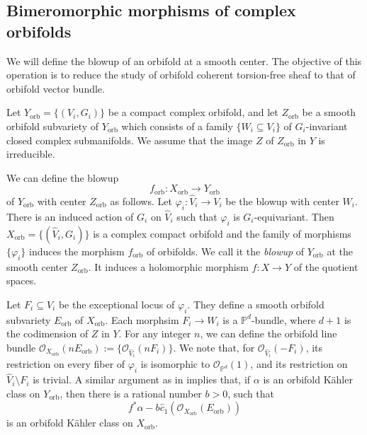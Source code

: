 \documentclass[12pt]{amsart}
\newcommand{\<}{\leq}
\def\mcO{\mathcal{O}}
\theoremstyle{remark}
\theoremstyle{definition}
\theoremstyle{definition}
\numberwithin{equation}{section}
\theoremstyle{definition}
\theoremstyle{definition}
\def\orb{\mathrm{orb}}
\begin{document}
\subsection{Bimeromorphic morphisms of complex orbifolds} 

We will define the blowup of an orbifold at a smooth center.  
The objective of this operation is to reduce the study of orbifold coherent torsion-free sheaf to that of orbifold vector bundle. 


Let $Y_{\orb}=\{(V_i,G_i)\}$ be a compact complex   orbifold, and let 
  $Z_{\orb}$ be a smooth orbifold subvariety of $Y_{\orb}$ which consists of a family $\{W_i\subseteq V_i\}$ of $G_i$-invariant closed complex submanifolds. 
We assume that  the image   $Z$ of $Z_{\orb}$ in $Y$ is irreducible.  

We can define the blowup 
\[ f_{\orb} \colon X_{\orb} \to Y_{\orb} \]
of $Y_{\orb}$ with center $Z_{\orb}$ as follows. 
Let $\varphi_i \colon \widehat{V}_i \to V_i$ be the blowup with center $W_i$. 
There is an induced action of $G_i$ on $\widehat{V}_i$ such that  $\varphi_i$ is $G_i$-equivariant. 
Then $X_{\orb} = \{(\widehat{V}_i,G_i)\}$  is a complex compact orbifold and the family of morphisms $\{\varphi_i\}$ induces the morphism $f_{\orb}$ of orbifolds. 
We call it the \textit{blowup} of $Y_\orb$ at the  smooth center $Z_{\orb}$.  
It induces a holomorphic morphism  $f \colon X\to Y$  of the quotient spaces. 



Let $F_i\subseteq \widehat{V}_i$ be the exceptional locus of $\varphi_i$.  
They define a  smooth  orbifold subvariety $E_{\orb}$ of $X_{\orb}$. 
Each morphsim $F_i \to W_i$ is a $\mathbb{P}^d$-bundle, where $d+1$ is the codimension of $Z$ in $Y$. 
For any integer $n$, 
we  can define the orbifold line bundle  $\mcO_{X_{\orb}}(nE_{\orb}) := \{ \mcO_{\widehat{V}_{i}}(nF_{i} )\}$. 
We note that,  for  $\mcO_{\widehat{V}_{i}}(-F_{i})$, its restriction on every fiber of $\varphi_i$ is isomorphic to $\mcO_{\mathbb{P}^d}(1)$, and its restriction on $ \widehat{V}_i\setminus{F_{i}}$ is trivial.  
A similar argument as in \cite[Proposition 3.24]{Voisin2002} implies that, if $\alpha$ is an orbifold K\"ahler class on $Y_{\orb}$, then there is a rational number  $b>0$, such that 
\[ 
f^*\alpha - b \hat{c}_1(\mcO_{X_{\orb}}(E_{\orb}))
\]
is an orbifold  K\"ahler class on $X_{\orb}$.  
\end{document}

